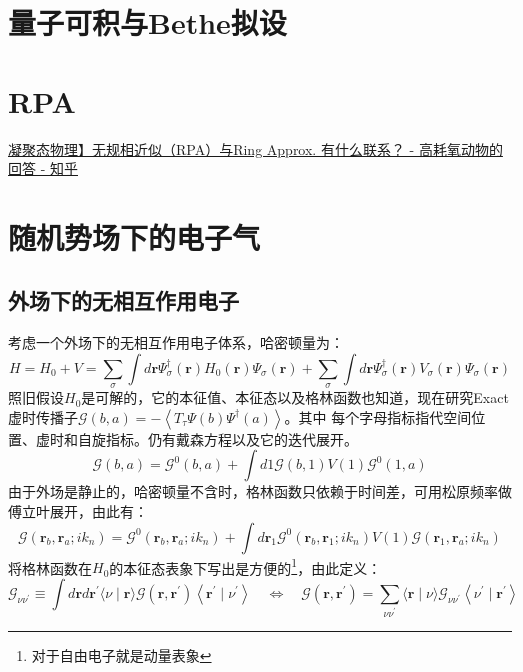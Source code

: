 \documentclass[10pt,openany]{book}
\theoremstyle{thmstyle} %
\theoremstyle{defstyle} %
\theoremstyle{prostyle} %
\begin{document}
\section{量子可积与Bethe拟设}
\section{RPA}
\href{https://www.zhihu.com/question/384993011/answer/3030775169}{凝聚态物理】无规相近似（RPA）与Ring Approx. 有什么联系？ - 高耗氧动物的回答 - 知乎}
\section{随机势场下的电子气}
\subsection*{外场下的无相互作用电子}
考虑一个外场下的无相互作用电子体系，哈密顿量为：
\begin{equation}
  H=H_0+V=\sum_\sigma \int d \mathbf{r} \Psi_\sigma^{\dagger}(\mathbf{r}) H_0(\mathbf{r}) \Psi_\sigma(\mathbf{r})+\sum_\sigma \int d \mathbf{r} \Psi_\sigma^{\dagger}(\mathbf{r}) V_\sigma(\mathbf{r}) \Psi_\sigma(\mathbf{r})
\end{equation}
照旧假设$ H_0 $是可解的，它的本征值、本征态以及格林函数也知道，现在研究Exact虚时传播子$ \mathcal{G}(b, a)=-\left\langle T_\tau \Psi(b) \Psi^{\dagger}(a)\right\rangle $。其中
每个字母指标指代空间位置、虚时和自旋指标。仍有戴森方程以及它的迭代展开。  
\begin{equation}
  \mathcal{G}(b, a)=\mathcal{G}^0(b, a)+\int d 1 \mathcal{G}(b, 1) V(1) \mathcal{G}^0(1, a)
  \label{Daysoneq}
\end{equation}
由于外场是静止的，哈密顿量不含时，格林函数只依赖于时间差，可用松原频率做傅立叶展开，由此有：
\begin{equation}
  \mathcal{G}\left(\mathbf{r}_b, \mathbf{r}_a ; i k_n\right)=\mathcal{G}^0\left(\mathbf{r}_b, \mathbf{r}_a ; i k_n\right)+\int d \mathbf{r}_1 \mathcal{G}^0\left(\mathbf{r}_b, \mathbf{r}_1 ; i k_n\right) V(1) \mathcal{G}\left(\mathbf{r}_1, \mathbf{r}_a ; i k_n\right)
\end{equation}
将格林函数在$ H_0 $的本征态表象下写出是方便的\footnote{对于自由电子就是动量表象}，由此定义：
\begin{equation}
  \mathcal{G}_{\nu \nu^{\prime}} \equiv \int d \mathbf{r} d \mathbf{r}^{\prime}\langle\nu \mid \mathbf{r}\rangle \mathcal{G}\left(\mathbf{r}, \mathbf{r}^{\prime}\right)\left\langle\mathbf{r}^{\prime} \mid \nu^{\prime}\right\rangle \quad \Leftrightarrow \quad \mathcal{G}\left(\mathbf{r}, \mathbf{r}^{\prime}\right)=\sum_{\nu \nu^{\prime}}\langle\mathbf{r} \mid \nu\rangle \mathcal{G}_{\nu \nu^{\prime}}\left\langle\nu^{\prime} \mid \mathbf{r}^{\prime}\right\rangle
\end{equation} 
\end{document}
